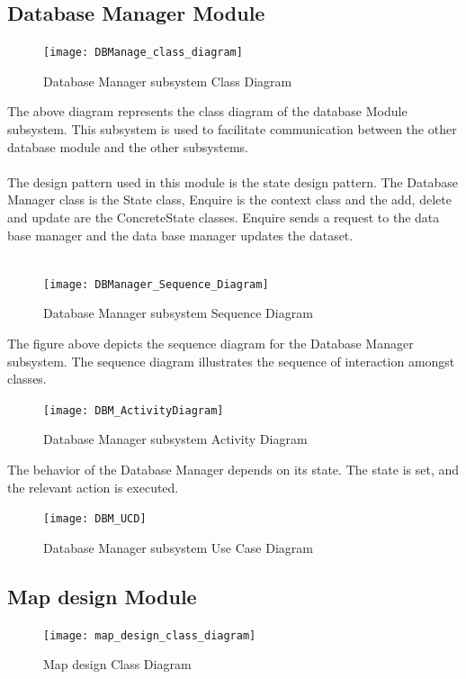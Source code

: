 \documentclass{article}
\begin{document}
       \subsection{Database Manager Module}
      
        \begin{figure}[h!]
        \texttt{[image: DBManage\_class\_diagram]}
        	\caption{Database Manager subsystem Class Diagram}
            \end{figure}
     
The above diagram represents the class diagram of the database Module subsystem. This subsystem is used to facilitate communication between the other database module and the other subsystems.
 \\\\
The design pattern used in this module is the state design pattern. The Database Manager class is the State class, Enquire is the context class and the add, delete and update are the ConcreteState classes. Enquire sends a request to the data base manager and the data base manager updates the dataset. 
\\\\
\newpage
	\begin{figure}[h!]
    \texttt{[image: DBManager\_Sequence\_Diagram]}
    \caption{Database Manager subsystem Sequence Diagram}
    \end{figure}
   
  The figure above depicts the sequence diagram for the Database Manager subsystem. The sequence diagram illustrates the sequence of interaction amongst classes.
  
    \begin{figure}[h!]
     \centering  \texttt{[image: DBM\_ActivityDiagram]}
     \caption{Database Manager subsystem Activity Diagram}
    \end{figure}
    The behavior of the Database Manager depends on its state. The state is set, and the relevant action is executed.
    \begin{figure}[h!]
     \centering  \texttt{[image: DBM\_UCD]}
     \caption{Database Manager subsystem Use Case Diagram}
    \end{figure}
    
\pagebreak     
       \subsection{Map design Module}
        \begin{figure}[h!]
        \texttt{[image: map\_design\_class\_diagram]}
        	\caption{Map design Class Diagram}
            \end{figure}
            
\end{document}
